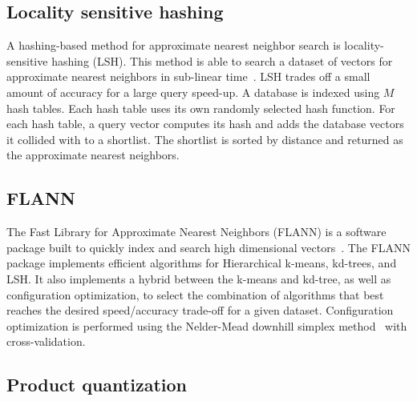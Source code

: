         \subsection{Locality sensitive hashing}
            A hashing-based method for approximate nearest neighbor
              search is locality-sensitive hashing (LSH).
            This method is able to search a dataset of vectors for
              approximate nearest neighbors in sub-linear
              time~\cite{charikar_similarity_2002,
              datar_locality_sensitive_2004, kulis_fast_2009,
              kulis_kernelized_2012, tao_locality_2013}.
            LSH trades off a small amount of accuracy for a large query
              speed-up.
            A database is indexed using $M$ hash tables.
            Each hash table uses its own randomly selected hash
              function.
            For each hash table, a query vector computes its hash and
              adds the database vectors it collided with to a shortlist.
            The shortlist is sorted by distance and returned as the
              approximate nearest neighbors.

        \subsection{FLANN}
            The Fast Library for Approximate Nearest Neighbors (FLANN)
              is a software package built to quickly index and search
              high dimensional vectors~\cite{muja_fast_2009}.
            The FLANN package implements efficient algorithms for
              Hierarchical k-means, kd-trees, and LSH{}.
            It also implements a hybrid between the k-means and
              kd-tree, as well as configuration optimization, to select
              the combination of algorithms that best reaches the desired
              speed/accuracy trade-off for a given dataset.
            Configuration optimization is performed using the
              Nelder-Mead downhill simplex
              method~\cite{nelder_simplex_1965} with cross-validation.


        \subsection{Product quantization}
        

